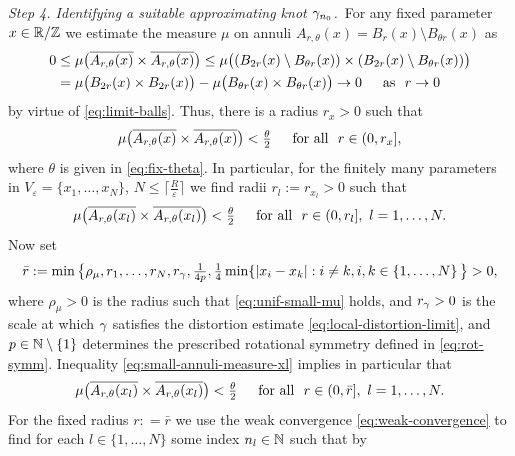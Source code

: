 {\it Step 4. Identifying a suitable approximating knot $\gamma_{n_0}$.}\,
For any fixed parameter $x\in\mathbb{R}/\mathbb{Z}$ we estimate the measure $\mu$ on annuli
$A_{r,\theta}(x)=B_r(x)\setminus B_{\theta r}(x)$ as
\begin{align*}
0 & \le \mu\big( \overline{A_{r,\theta}(x)}\times
\overline{A_{r,\theta}(x)}\big)\le
\mu\big((B_{2r}(x)\setminus B_{\theta r}(x))\times
(B_{2r}(x)\setminus B_{\theta r}(x))\big)\\
& = \mu\big( B_{2r}(x)\times B_{2r}(x) \big)-
\mu\big( B_{\theta r}(x)\times B_{\theta r}(x)\big)
\to 0\quad\,\,\,\text{as }\,\, r\to 0
\end{align*}
by virtue of \eqref{eq:limit-balls}. Thus, there is a radius $r_x>0$
such that
\begin{equation}\label{eq:small-annuli-measure}
\mu\big( \overline{A_{r,\theta}(x)}\times
\overline{A_{r,\theta}(x)} \big) <\textstyle\frac{\theta}2\quad\,\,\,\text{for all }\,\,
r\in (0,r_x],
\end{equation}
where $\theta$ is given in \eqref{eq:fix-theta}.
In particular, for the finitely many parameters in
$V_\varepsilon=\{x_1,\ldots,x_N\}$, $N\le\lceil\frac{R}\varepsilon
\rceil$ we find radii $r_l:=r_{x_l}>0$ such that
\begin{equation}\label{eq:small-annuli-measure-xl}
\mu\big( \overline{A_{r,\theta}(x_l)}\times
\overline{A_{r,\theta}(x_l)} \big) 
<\textstyle\frac{\theta}2\quad\,\,\,\text{for all }\,\,
r\in (0,r_l],\,\,l=1,\ldots,N.
\end{equation}
Now set
\begin{equation}\label{eq:final-radius}
\bar{r}:=
\textstyle
\min\big\{\rho_\mu,r_1,\ldots,r_N,r_\gamma,\frac1{4p},\frac14\min\{|x_i-x_k|:
i\not=k,i,k\in\{1,\ldots,N\}\,\big\} >0,
\end{equation}
where $\rho_\mu>0$ is the radius such that \eqref{eq:unif-small-mu}
holds, and $r_\gamma>0$ is the scale at which $\gamma$ satisfies the
distortion estimate \eqref{eq:local-distortion-limit}, and $p\in\mathbb{N}\setminus
\{1\}$ determines the prescribed rotational symmetry defined in \eqref{eq:rot-symm}.
Inequality \eqref{eq:small-annuli-measure-xl} implies in particular that
\begin{equation}\label{eq:small-annuli-measure-xl-unif}
\mu\big( \overline{A_{r,\theta}(x_l)}\times
\overline{A_{r,\theta}(x_l)} \big)
<\textstyle\frac{\theta}2\quad\,\,\,\text{for all }\,\,
r\in (0,\bar{r}],\,\,l=1,\ldots,N.
\end{equation}
For the fixed radius $r:
=\bar{r}$ we use the weak convergence \eqref{eq:weak-convergence} to find for each $l\in\{1,\ldots,N\}$ some index $n_l\in\mathbb{N}$ such
that by \cite[Theorem~1.40]{evans-gariepy_2015}
